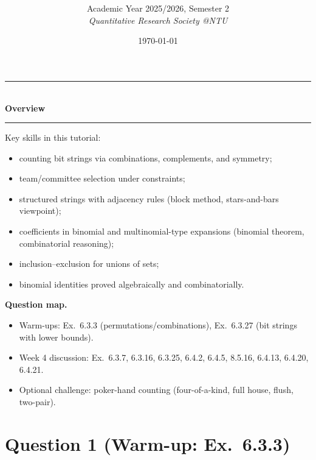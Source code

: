 \documentclass[12pt]{article}
\title{
\CourseCode \CourseName \\[0.3em]
\large \DocType
}
\author{
  Academic Year 2025/2026, Semester 2 \\[0.25em]
  \textit{Quantitative Research Society @NTU}
}
\date{\today}
\begin{document}
\maketitle
\thispagestyle{plainfirst}
\pagestyle{main}


\begin{center}
  \rule{0.82\textwidth}{0.4pt}\\[4pt]
  \textbf{Overview}\\[2pt]
  \rule{0.82\textwidth}{0.4pt}
\end{center}

\noindent
Key skills in this tutorial:
\begin{itemize}[leftmargin=*]
  \item counting bit strings via combinations, complements, and symmetry;
  \item team/committee selection under constraints;
  \item structured strings with adjacency rules (block method, stars-and-bars viewpoint);
  \item coefficients in binomial and multinomial-type expansions (binomial theorem, combinatorial reasoning);
  \item inclusion--exclusion for unions of sets;
  \item binomial identities proved algebraically and combinatorially.
\end{itemize}

\noindent
\textbf{Question map.}
\begin{itemize}[leftmargin=*]
  \item Warm-ups: Ex.\ 6.3.3 (permutations/combinations), Ex.\ 6.3.27 (bit strings with lower bounds).
  \item Week 4 discussion: Ex.\ 6.3.7, 6.3.16, 6.3.25, 6.4.2, 6.4.5, 8.5.16, 6.4.13, 6.4.20, 6.4.21.
  \item Optional challenge: poker-hand counting (four-of-a-kind, full house, flush, two-pair).
\end{itemize}

\newpage
\tableofcontents
\newpage
\section{Question 1 (Warm-up: Ex.\ 6.3.3)}
\end{document}

